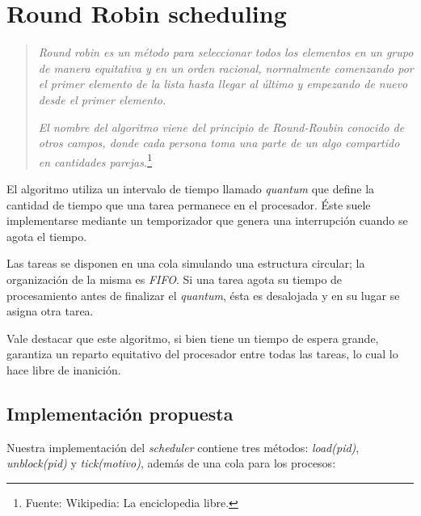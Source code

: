 \section{Round Robin scheduling}

\begin{quote}
	\textit{Round robin es un método para seleccionar todos los elementos en un grupo de manera equitativa y en un orden racional, normalmente comenzando por el primer elemento de la lista hasta llegar al último y empezando de nuevo desde el primer elemento.} 
	
	\textit{El nombre del algoritmo viene del principio de Round-Roubin conocido de otros campos, donde cada persona toma una parte de un algo compartido en cantidades parejas.}\footnote{Fuente: Wikipedia: La enciclopedia libre.}
	
\end{quote}
	
	El algoritmo utiliza un intervalo de tiempo llamado \emph{quantum} que define la cantidad de tiempo que una tarea permanece en el procesador. Éste suele implementarse mediante un temporizador que genera una interrupción cuando se agota el tiempo.
	
	Las tareas se disponen en una cola simulando una estructura circular; la organización de la misma es \emph{FIFO}. Si una tarea agota su tiempo de procesamiento antes de finalizar el \emph{quantum}, ésta es desalojada y en su lugar se asigna otra tarea.
	
	Vale destacar que este algoritmo, si bien tiene un tiempo de espera grande, garantiza un reparto equitativo del procesador entre todas las tareas, lo cual lo hace libre de inanición.

\subsection{Implementación propuesta}

Nuestra implementación del \emph{scheduler} contiene tres métodos: \emph{load(pid)}, \emph{unblock(pid)} y \emph{tick(motivo)}, además de una cola para los procesos:

